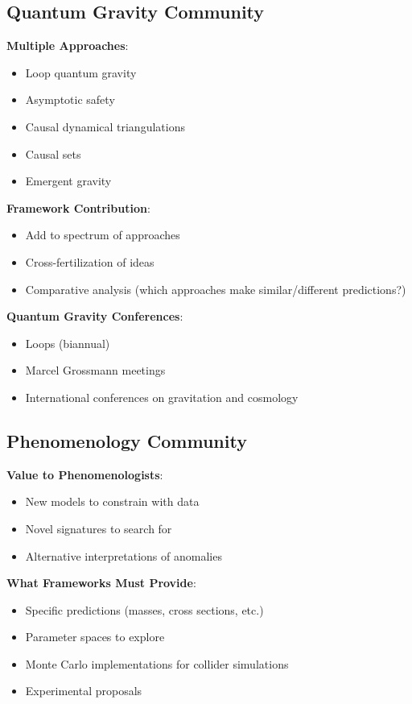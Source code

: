 \subsection{Quantum Gravity Community}

\textbf{Multiple Approaches}:
\begin{itemize}
    \item Loop quantum gravity
    \item Asymptotic safety
    \item Causal dynamical triangulations
    \item Causal sets
    \item Emergent gravity
\end{itemize}

\textbf{Framework Contribution}:
\begin{itemize}
    \item Add to spectrum of approaches
    \item Cross-fertilization of ideas
    \item Comparative analysis (which approaches make similar/different predictions?)
\end{itemize}

\textbf{Quantum Gravity Conferences}:
\begin{itemize}
    \item Loops (biannual)
    \item Marcel Grossmann meetings
    \item International conferences on gravitation and cosmology
\end{itemize}

\subsection{Phenomenology Community}

\textbf{Value to Phenomenologists}:
\begin{itemize}
    \item New models to constrain with data
    \item Novel signatures to search for
    \item Alternative interpretations of anomalies
\end{itemize}

\textbf{What Frameworks Must Provide}:
\begin{itemize}
    \item Specific predictions (masses, cross sections, etc.)
    \item Parameter spaces to explore
    \item Monte Carlo implementations for collider simulations
    \item Experimental proposals
\end{itemize}


